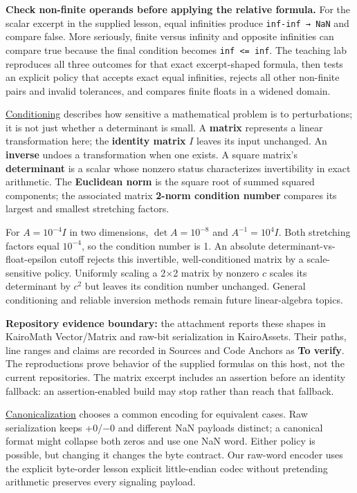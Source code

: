 \textbf{Check non-finite operands before applying the relative formula.} For the scalar excerpt in the supplied lesson, equal infinities produce \texttt{inf-inf\ →\ NaN} and compare false. More seriously, finite versus infinity and opposite infinities can compare true because the final condition becomes \texttt{inf\ \textless{}=\ inf}. The teaching lab reproduces all three outcomes for that exact excerpt-shaped formula, then tests an explicit policy that accepts exact equal infinities, rejects all other non-finite pairs and invalid tolerances, and compares finite floats in a widened domain.

\hyperref[appendix-8f6a01f284a7]{Conditioning} describes how sensitive a mathematical problem is to perturbations; it is not just whether a determinant is small. A \textbf{matrix} represents a linear transformation here; the \textbf{identity matrix} \(I\) leaves its input unchanged. An \textbf{inverse} undoes a transformation when one exists. A square matrix's \textbf{determinant} is a scalar whose nonzero status characterizes invertibility in exact arithmetic. The \textbf{Euclidean norm} is the square root of summed squared components; the associated matrix \textbf{2-norm condition number} compares its largest and smallest stretching factors.

For \(A=10^{-4}I\) in two dimensions, \(\det A=10^{-8}\) and \(A^{-1}=10^4I\). Both stretching factors equal \(10^{-4}\), so the condition number is 1. An absolute determinant-vs-float-epsilon cutoff rejects this invertible, well-conditioned matrix by a scale-sensitive policy. Uniformly scaling a 2×2 matrix by nonzero \(c\) scales its determinant by \(c^2\) but leaves its condition number unchanged. General conditioning and reliable inversion methods remain future linear-algebra topics.

\textbf{Repository evidence boundary:} the attachment reports these shapes in KairoMath Vector/Matrix and raw-bit serialization in KairoAssets. Their paths, line ranges and claims are recorded in Sources and Code Anchors as \textbf{To verify}. The reproductions prove behavior of the supplied formulas on this host, not the current repositories. The matrix excerpt includes an assertion before an identity fallback: an assertion-enabled build may stop rather than reach that fallback.

\hyperref[appendix-e90053a4b201]{Canonicalization} chooses a common encoding for equivalent cases. Raw serialization keeps +0/−0 and different NaN payloads distinct; a canonical format might collapse both zeros and use one NaN word. Either policy is possible, but changing it changes the byte contract. Our raw-word encoder uses the explicit byte-order lesson explicit little-endian codec without pretending arithmetic preserves every signaling payload.

